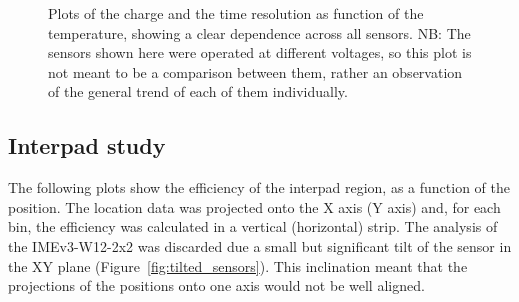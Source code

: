 \begin{figure}[h!tbp]
    \centering
    \begin{minipage}[c]{.49\linewidth}
        \end{minipage}
        \hfill
        \begin{minipage}[c]{.49\linewidth}
    \end{minipage}
    \vfill
    \begin{minipage}[c]{.49\linewidth}
        \end{minipage}
        \hfill
        \begin{minipage}[c]{.49\linewidth}
        \end{minipage}
    
    \captionsetup{width=\captionwidth}
    \caption{Plots of the charge and the time resolution as function of the temperature, showing a clear dependence across all sensors. NB: The sensors shown here were operated at different voltages, so this plot is not meant to be a comparison between them, rather an observation of the general trend of each of them individually.}
\end{figure}

\FloatBarrier
\subsection{Interpad study}\label{sec:neighbouring_pads}

The following plots show the efficiency of the interpad region, as a function of the position. The location data was projected onto the X axis (Y axis) and, for each bin, the efficiency was calculated in a vertical (horizontal) strip. The analysis of the IMEv3-W12-2x2 was discarded due a small but significant tilt of the sensor in the XY plane (Figure~\ref{fig:tilted_sensors}). This inclination meant that the projections of the positions onto one axis would not be well aligned. 

